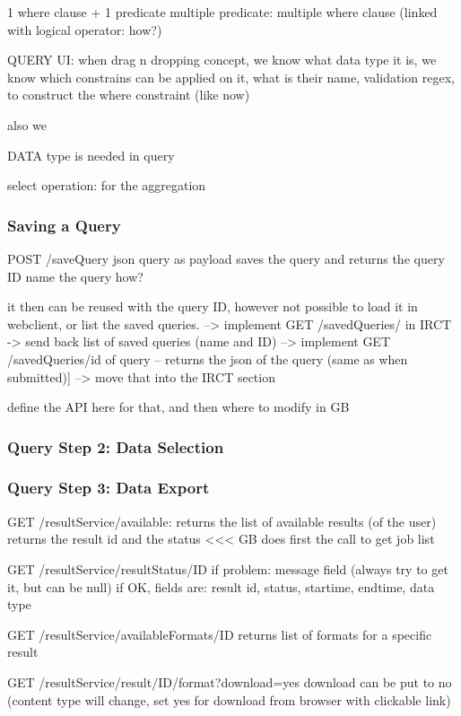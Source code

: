 1 where clause + 1 predicate
multiple predicate: multiple where clause (linked with logical operator: how?)

QUERY UI:
when drag n dropping concept, we know what data type it is, we know which constrains can be applied on it, what is their name, validation regex, to construct the where constraint (like now)

also we 

DATA type is needed in query

select operation: for the aggregation


\subsubsection{Saving a Query}

POST /saveQuery
json query as payload
saves the query and returns the query ID
name the query how?

it then can be reused with the query ID, however not possible to load it in webclient, or list the saved queries.
--> implement GET /savedQueries/ in IRCT -> send back list of saved queries (name and ID)
--> implement GET /savedQueries/{id of query} -- returns the json of the query (same as when submitted)]
--> move that into the IRCT section 


define the API here for that, and then where to modify in GB

\subsubsection{Query Step 2:  Data Selection}




\subsubsection{Query Step 3:  Data Export}

GET /resultService/available: returns the list of available results (of the user)
returns the result id and the status
<<< GB does first the call to get job list

GET /resultService/resultStatus/ID
if problem: message field (always try to get it, but can be null)
if OK, fields are: result id, status, startime, endtime, data type

GET /resultService/availableFormats/ID
returns list of formats for a specific result

GET /resultService/result/ID/format?download=yes
download can be put to no (content type will change, set yes for download from browser with clickable link)


